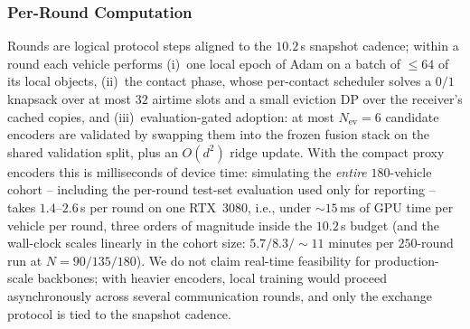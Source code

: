\subsubsection{Per-Round Computation}
Rounds are logical protocol steps aligned to the $10.2$\,s snapshot
cadence; within a round each vehicle performs (i)~one local epoch of
Adam on a batch of $\le 64$ of its local objects, (ii)~the contact
phase, whose per-contact scheduler solves a $0/1$ knapsack over at most
$32$ airtime slots and a small eviction DP over the receiver's cached
copies, and (iii)~evaluation-gated adoption: at most
$N_{\mathrm{ev}}{=}6$ candidate encoders are validated by swapping them
into the frozen fusion stack on the shared validation split, plus an
$O(d^2)$ ridge update. With the compact proxy encoders this is
milliseconds of device time: simulating the \emph{entire} $180$-vehicle
cohort -- including the per-round test-set evaluation used only for
reporting -- takes $1.4$--$2.6$\,s per round on one RTX~3080, i.e.,
under ${\sim}15$\,ms of GPU time per vehicle per round, three orders of
magnitude inside the $10.2$\,s budget (and the wall-clock scales
linearly in the cohort size: $5.7/8.3/{\sim}11$ minutes per
$250$-round run at $N{=}90/135/180$). We do not claim real-time
feasibility for production-scale backbones; with heavier encoders,
local training would proceed asynchronously across several
communication rounds, and only the exchange protocol is tied to the
snapshot cadence.

